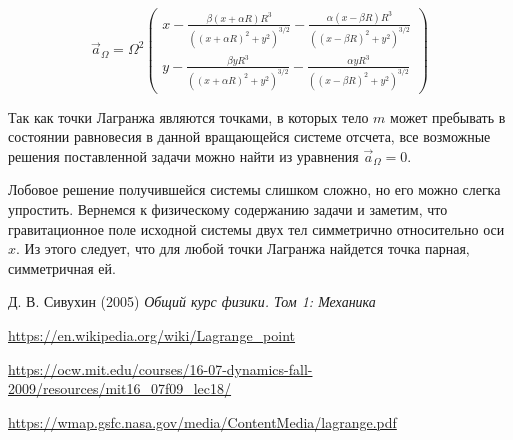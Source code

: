 \documentclass[12pt]{article}
\begin{document}
    \begin{equation}
        \vec{a}_{\Omega} = \Omega^2
        \begin{pmatrix}
            x - \frac{\beta (x + \alpha R)R^3}{((x + \alpha R)^2 + y^2)^{3/2}} - 
            \frac{\alpha (x - \beta R)R^3}{((x - \beta R)^2 + y^2)^{3/2}} \\
            y - \frac{\beta y R^3}{((x + \alpha R)^2 + y^2)^{3/2}} - 
            \frac{\alpha y R^3}{((x - \beta R)^2 + y^2)^{3/2}}
        \end{pmatrix}
    \end{equation}

    \par Так как точки Лагранжа являются точками, в которых тело $m$ может пребывать в 
    состоянии равновесия в данной вращающейся системе отсчета, все возможные решения
    поставленной задачи можно найти из уравнения $\vec{a}_{\Omega} = 0$.

    \par Лобовое решение получившейся системы слишком сложно, но его можно слегка
    упростить. Вернемся к физическому содержанию задачи и заметим, 
    что гравитационное поле исходной системы двух тел симметрично 
    относительно оси $x$. Из этого следует, что для любой точки Лагранжа найдется
    точка парная, симметричная ей.

    \begin{thebibliography}{10}
        Д. В. Сивухин (2005) \emph{Общий курс физики. Том 1: Механика}
        
        \url{https://en.wikipedia.org/wiki/Lagrange_point}

        \url{https://ocw.mit.edu/courses/16-07-dynamics-fall-2009/resources/mit16_07f09_lec18/}

        \url{https://wmap.gsfc.nasa.gov/media/ContentMedia/lagrange.pdf}
    \end{thebibliography}
\end{document}
